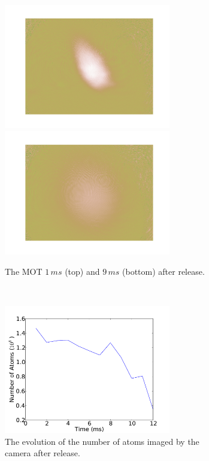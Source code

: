 \begin{figure}[h]
\centering
    \begin{subfigure}[b]{0.3\textwidth}
    \centering
    \includegraphics[width=0.8\textwidth]{figs/MOTimage1.png}
    \includegraphics[width=0.8\textwidth]{figs/MOTimage2.png}
    \caption{The MOT $1\,\unit{ms}$ (top) and $9\,\unit{ms}$ (bottom) after release.}
    \end{subfigure}~~~\begin{subfigure}[b]{0.6\textwidth}
    \centering
    \includegraphics[width=0.8\textwidth]{figs/MOT_atom_count.pdf}
    \caption{The evolution of the number of atoms imaged by the camera after release.}
    \label{fig:mot_atom_count}
    \end{subfigure}
    \caption{}
\end{figure}

